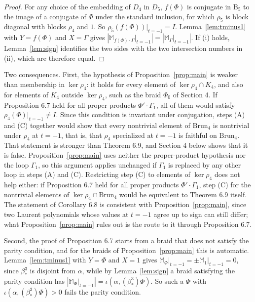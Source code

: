 \documentclass[11pt]{amsart}
\theoremstyle{remark}
\newcommand{\M}{\mathbb{M}}
\newcommand{\B}{\mathrm{B}}
\newcommand{\Brun}{\mathrm{Brun}}
\newcommand{\bs}{\beta^3_*}
\newcommand{\at}{\big|_{t=-1}}
\begin{document}
\begin{proof}
For any choice of the embedding of $D_4$ in $D_5$, $f(\Phi)$ is conjugate in $\B_5$ to the image of a conjugate of $\Phi$ under the standard inclusion, for which $\rho_5$ is block diagonal with blocks $\rho_4$ and $1$. So $\rho_5(f(\Phi))\at=I$. Lemma~\ref{lem:tminus1} with $Y=f(\Phi)$ and $X=\Gamma$ gives $|\M_{f(\Phi)\cdot\Gamma}\at|=|\M_\Gamma\at|$. If (i) holds, Lemma~\ref{lem:sign} identifies the two sides with the two intersection numbers in (ii), which are therefore equal.
\end{proof}

Two consequences. First, the hypothesis of Proposition~\ref{prop:main} is weaker than membership in $\ker\rho_4$: it holds for every element of $\ker\rho_4\cap K_4$, and also for elements of $K_4$ outside $\ker\rho_4$, such as the braid $\Phi_0$ of Section 4. If Proposition 6.7 held for all proper products $\Phi'\cdot\Gamma_1$, all of them would satisfy $\rho_4(\Phi)\at\neq I$. Since this condition is invariant under conjugation, steps (A) and (C) together would show that every nontrivial element of $\Brun_4$ is nontrivial under $\rho_4$ at $t=-1$, that is, that $\rho_4$ specialized at $t=-1$ is faithful on $\Brun_4$. That statement is stronger than Theorem 6.9, and Section 4 below shows that it is false. Proposition~\ref{prop:main} uses neither the proper-product hypothesis nor the loop $\Gamma_1$, so this argument applies unchanged if $\Gamma_1$ is replaced by any other loop in steps (A) and (C). Restricting step (C) to elements of $\ker\rho_4$ does not help either: if Proposition 6.7 held for all proper products $\Phi'\cdot\Gamma_1$, step (C) for the nontrivial elements of $\ker\rho_4\cap\Brun_4$ would be equivalent to Theorem 6.9 itself. The statement of Corollary 6.8 is consistent with Proposition~\ref{prop:main}, since two Laurent polynomials whose values at $t=-1$ agree up to sign can still differ; what Proposition~\ref{prop:main} rules out is the route to it through Proposition 6.7.

Second, the proof of Proposition 6.7 starts from a braid that does not satisfy the parity condition, and for the braids of Proposition~\ref{prop:main} this is automatic. Lemma~\ref{lem:tminus1} with $Y=\Phi$ and $X=1$ gives $\M_\Phi\at=\pm\M_1\at=0$, since $\bs$ is disjoint from $\alpha$, while by Lemma~\ref{lem:sign} a braid satisfying the parity condition has $|\M_\Phi\at|=\iota(\alpha,(\bs)\Phi)$. So such a $\Phi$ with $\iota(\alpha,(\bs)\Phi)>0$ fails the parity condition.
\end{document}
